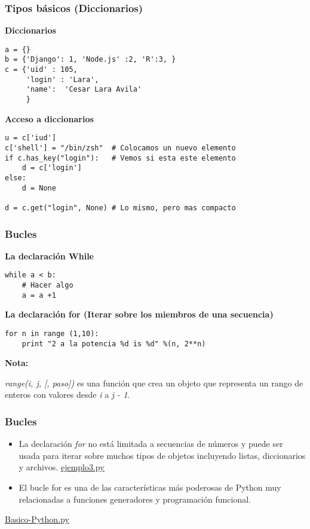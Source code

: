\documentclass[10pt]{beamer}
\begin{document}
\begin{frame}[fragile]
\frametitle{Tipos b\'asicos (Diccionarios)}
\textbf{Diccionarios}
\begin{lstlisting}
a = {}
b = {'Django': 1, 'Node.js' :2, 'R':3, }
c = {'uid' : 105,
	 'login' : 'Lara',
	 'name':  'Cesar Lara Avila'
	 }
\end{lstlisting}

\textbf{Acceso a diccionarios}
\begin{lstlisting}
u = c['iud']              
c['shell'] = "/bin/zsh"  # Colocamos un nuevo elemento
if c.has_key("login"):   # Vemos si esta este elemento
    d = c['login']      
else:
    d = None
    
d = c.get("login", None) # Lo mismo, pero mas compacto
\end{lstlisting}

\end{frame}

\begin{frame}[fragile]
\frametitle{Bucles}
\textbf{La declaraci\'on While}
\begin{lstlisting}
while a < b:
    # Hacer algo
    a = a +1
\end{lstlisting}

\vspace{0.2cm}

\textbf{La declaraci\'on for (Iterar sobre los miembros de una secuencia)}

\begin{lstlisting}
for n in range (1,10):
    print "2 a la potencia %d is %d" %(n, 2**n)
\end{lstlisting}

\vspace{0.3cm}

\textbf{Nota:}

\textit{range(i, j, [, paso])} es una funci\'on que crea un objeto que representa un rango de enteros con valores desde \textit{i} a \textit{j - 1}.
\end{frame}

\begin{frame}[fragile]
\frametitle{Bucles}
\begin{itemize}
\item La declaraci\'on \textit{for } no est\'a limitada a secuencias de n\'umeros y puede ser usada para iterar sobre muchos tipos de objetos incluyendo listas, diccionarios y archivos.
\href{run:ejemplo1.py}{\underline{ejemplo3.py}}
\item El bucle for es una de las caracter\'isticas m\'as poderosas de Python muy relacionadas a funciones generadores y programaci\'on funcional.

\end{itemize}


\vspace{0.3cm}


\href{run:funcion0.py}{\underline{Basico-Python.py}}
\end{frame}
\end{document}
